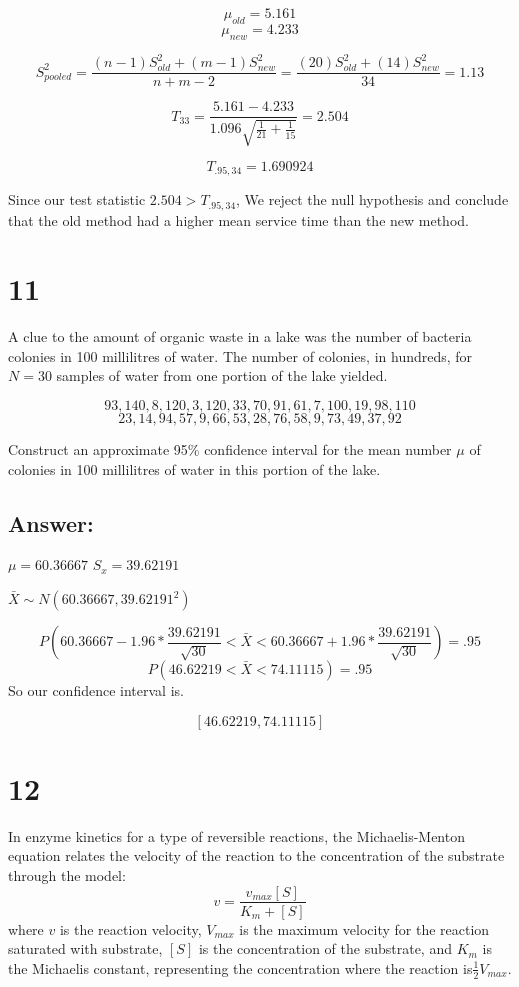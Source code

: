 \documentclass[svgnames]{article}
\begin{document}
$$\mu_{old} = 5.161$$
$$\mu_{new} = 4.233$$

$$S^2_{pooled}=\frac{(n-1)S_{old}^2+(m-1)S_{new}^2}{n+m-2}=\frac{(20)S_{old}^2+(14)S_{new}^2}{34}=1.13$$

$$T_{33}=\frac{5.161-4.233}{1.096\sqrt{\frac{1}{21}+\frac{1}{15}}}=2.504$$

$$T_{.95, 34}= 1.690924$$

Since our test statistic $2.504> T_{.95, 34}$, We reject the null hypothesis and conclude that the old method had a higher mean service time than the new method.


\section*{11}
 A clue to the amount of organic waste in a lake was the number of bacteria colonies in 100 millilitres of water. The number of colonies, in hundreds, for $N = 30$ samples of water from one portion of the lake yielded.
 
 $$93, 140, 8, 120, 3, 120, 33, 70, 91, 61, 7, 100, 19, 98, 110$$
$$23, 14, 94, 57, 9, 66, 53, 28, 76, 58, 9, 73, 49, 37, 92$$

Construct an approximate 95\% confidence interval for the mean number $\mu$ of colonies in 100
millilitres of water in this portion of the lake.
\subsection*{Answer:}
$\mu = 60.36667$
\newline
$S_x = 39.62191$
\newline

$\bar{X} \sim N(60.36667, 39.62191^2)$

$$P(60.36667 - 1.96 * \frac{39.62191}{\sqrt{30}}< \bar{X} <60.36667 + 1.96 * \frac{39.62191}{\sqrt{30}})=.95$$
$$P(46.62219< \bar{X} < 74.11115 )=.95$$
So our confidence interval is.

$$[46.62219, 74.11115 ]$$

\section*{12}
In enzyme kinetics for a type of reversible reactions, the Michaelis-Menton equation relates the velocity of the reaction to the concentration of the substrate through the model:
$$ v = \frac{v_{max}[S]}{K_m + [S]}$$
where $v$ is the reaction velocity, $V_{max}$ is the maximum velocity for the reaction saturated with substrate, $[S]$ is the concentration of the substrate, and $K_m$ is the Michaelis constant, representing the concentration where the reaction is$ \frac{1}{2} V_{max}$.
\end{document}
